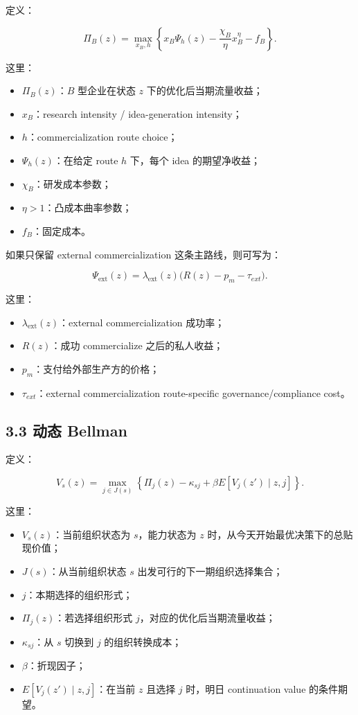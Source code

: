 \documentclass[12pt,fontset=none]{ctexart}
\begin{document}
定义：

\[
\Pi_B(z)
=
\max_{x_B,h}
\left\{
x_B\Psi_h(z)-\frac{\chi_B}{\eta}x_B^\eta-f_B
\right\}.
\]

这里：

\begin{itemize}[leftmargin=2em]
    \item \(\Pi_B(z)\)：\(B\) 型企业在状态 \(z\) 下的优化后当期流量收益；
    \item \(x_B\)：research intensity / idea-generation intensity；
    \item \(h\)：commercialization route choice；
    \item \(\Psi_h(z)\)：在给定 route \(h\) 下，每个 idea 的期望净收益；
    \item \(\chi_B\)：研发成本参数；
    \item \(\eta>1\)：凸成本曲率参数；
    \item \(f_B\)：固定成本。
\end{itemize}

如果只保留 external commercialization 这条主路线，则可写为：

\[
\Psi_{\text{ext}}(z)
=
\lambda_{\text{ext}}(z)\bigl(R(z)-p_m-\tau_{ext}\bigr).
\]

这里：

\begin{itemize}[leftmargin=2em]
    \item \(\lambda_{\text{ext}}(z)\)：external commercialization 成功率；
    \item \(R(z)\)：成功 commercialize 之后的私人收益；
    \item \(p_m\)：支付给外部生产方的价格；
    \item \(\tau_{ext}\)：external commercialization route-specific governance/compliance cost。
\end{itemize}

\subsection{3.3 动态 Bellman}

定义：

\[
V_s(z)=
\max_{j\in J(s)}
\left\{
\Pi_j(z)-\kappa_{sj}
+\beta E[V_j(z')\mid z,j]
\right\}.
\]

这里：

\begin{itemize}[leftmargin=2em]
    \item \(V_s(z)\)：当前组织状态为 \(s\)，能力状态为 \(z\) 时，从今天开始最优决策下的总贴现价值；
    \item \(J(s)\)：从当前组织状态 \(s\) 出发可行的下一期组织选择集合；
    \item \(j\)：本期选择的组织形式；
    \item \(\Pi_j(z)\)：若选择组织形式 \(j\)，对应的优化后当期流量收益；
    \item \(\kappa_{sj}\)：从 \(s\) 切换到 \(j\) 的组织转换成本；
    \item \(\beta\)：折现因子；
    \item \(E[V_j(z')\mid z,j]\)：在当前 \(z\) 且选择 \(j\) 时，明日 continuation value 的条件期望。
\end{itemize}
\end{document}
